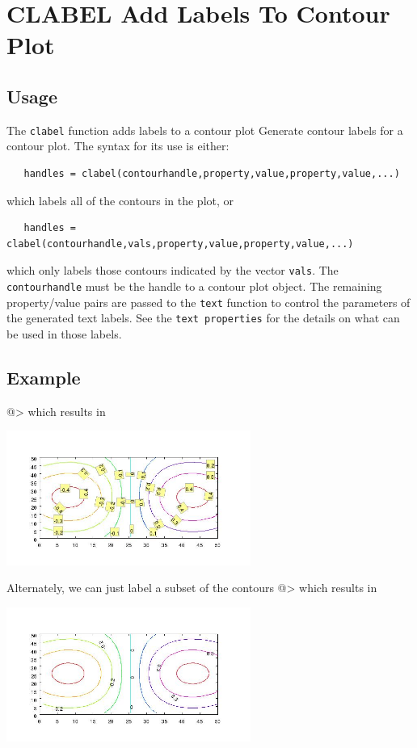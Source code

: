 \section{CLABEL Add Labels To Contour Plot}

\subsection{Usage}

The \verb|clabel| function adds labels to a contour plot
Generate contour labels for a contour plot.  The syntax
for its use is either:
\begin{verbatim}
   handles = clabel(contourhandle,property,value,property,value,...)
\end{verbatim}
which labels all of the contours in the plot, or
\begin{verbatim}
   handles = clabel(contourhandle,vals,property,value,property,value,...)
\end{verbatim}
which only labels those contours indicated by the vector \verb|vals|.
The \verb|contourhandle| must be the handle to a contour plot object.
The remaining property/value pairs are passed to the \verb|text| function
to control the parameters of the generated text labels.  See the 
\verb|text properties| for the details on what can be used in those labels.
\subsection{Example}

@>
which results in


\centerline{\includegraphics[width=8cm]{clabel1}}

Alternately, we can just label a subset of the contours
@>
which results in


\centerline{\includegraphics[width=8cm]{clabel2}}

